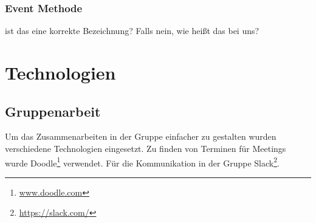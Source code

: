 \subsection*{Event Methode}
ist das eine korrekte Bezeichnung? Falls nein, wie heißt das bei uns?
\chapter{Technologien}
\section{Gruppenarbeit}
Um das Zusammenarbeiten in der Gruppe einfacher zu gestalten wurden verschiedene Technologien eingesetzt.
Zu finden von Terminen für Meetings wurde Doodle\footnote{\url{www.doodle.com}}  verwendet. Für die Kommunikation in der Gruppe Slack\footnote{\url{https://slack.com/}}.
